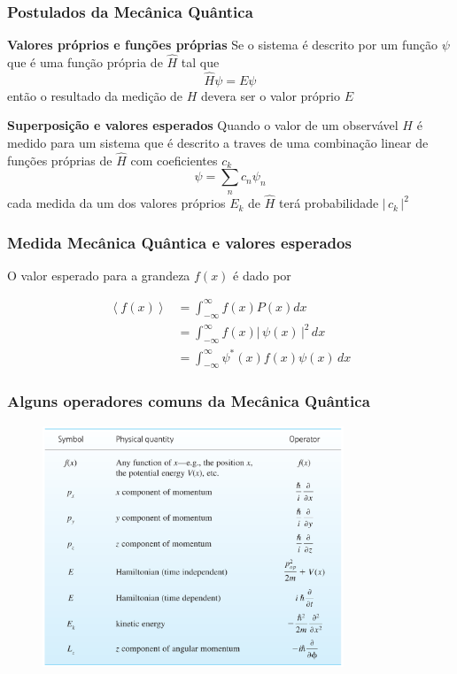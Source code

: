 \documentclass[12pt,brazil]{beamer}
\begin{document}
\begin{frame}
  \frametitle{Postulados da Mecânica Quântica}
  \fontsize{10pt}{11pt}\selectfont
  
  \textbf{Valores próprios e funções próprias}\newline
  Se o sistema é descrito por um função $\psi$ que é uma função própria de $\hat{H}$ tal que
  \[
   \hat{H}\psi = E\psi
  \]
  então o resultado da medição de $H$ devera ser o valor próprio $E$
   \newline

  \textbf{Superposição e valores esperados}\newline
  Quando o valor de um observável $H$ é medido para um sistema que é descrito a traves de uma combinação linear de funções próprias de $\hat{H}$  com coeficientes $c_k$
  \[
   \psi = \sum_n c_n\psi_n
  \]
  cada medida da um dos valores próprios $E_k$ de $\hat{H}$ terá probabilidade $\left| \, c_k  \, \right|^2$
\end{frame}


\begin{frame}
  \frametitle{Medida Mecânica Quântica e valores esperados}
  \fontsize{11pt}{11pt}\selectfont

  O valor esperado para a grandeza $f(x)$ é dado por
  
  \[
    \begin{align*}
      \left< f(x) \right> &= \int_{-\infty}^\infty f(x) P(x) dx\\
      &=\int_{-\infty}^\infty f(x)|\, \psi (x) \, |^2 \, dx\\
      &=\int_{-\infty}^\infty \psi^*(x) f(x) \psi (x) \, dx
    \end{align*}
  \]

  
\end{frame}

\begin{frame}
  \frametitle{Alguns operadores comuns da Mecânica Quântica}

  
  \begin{figure}
    \includegraphics[width=9cm]{figuras/fig17}
  \end{figure}
\end{frame}
\end{document}
